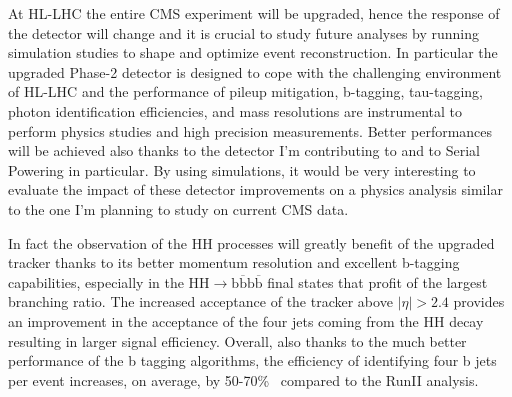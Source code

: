 \documentclass[a4paper,11pt,english]{article}
\begin{document}
\begin{description}[style=unboxed,leftmargin=.2cm]
\item[Simulation based Phase-2 physics studies: \bm{$\mathrm{HH \rightarrow b\overline{b}b\overline{b}}$}.] At HL-LHC %
the entire CMS experiment will be upgraded, hence the response of the detector will change and it is crucial to study future analyses by running simulation studies to shape and optimize event reconstruction. In particular the upgraded Phase-2 detector is designed to cope with the challenging environment of \mbox{HL-LHC} and the performance of pileup mitigation, b-tagging, tau-tagging, photon identification efficiencies, and mass resolutions are instrumental to perform physics studies and high precision measurements. 
Better performances will be achieved also thanks to the detector I'm contributing to and to Serial Powering in particular. By using simulations, it would be very interesting to evaluate the impact of these detector improvements on a physics analysis similar to the one I'm planning to study on current CMS data. %

In fact the observation of the HH processes will greatly benefit of the upgraded tracker thanks to its better momentum resolution and excellent b-tagging capabilities, especially in the $\mathrm{HH \rightarrow b\overline{b}b\overline{b}}$ final states that profit of the largest branching ratio. 
The increased acceptance of the tracker above $|\eta|>2.4$ provides an improvement in the acceptance of the four jets coming from the HH decay resulting in larger signal efficiency. Overall, also thanks to the much better performance of the b tagging algorithms, the efficiency of identifying four b jets per event increases, on average, by 50-70\%~\cite{TDR} compared to the RunII analysis.
\begin{siderules}
\end{siderules}
\end{description}
\end{document}
